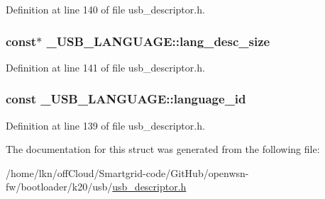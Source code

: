 Definition at line 140 of file usb\+\_\+descriptor.\+h.

\subsubsection[{\texorpdfstring{lang\+\_\+desc\+\_\+size}{lang_desc_size}}]{ const$\ast$ \+\_\+\+U\+S\+B\+\_\+\+L\+A\+N\+G\+U\+A\+G\+E\+::lang\+\_\+desc\+\_\+size}\hypertarget{struct___u_s_b___l_a_n_g_u_a_g_e_a77f740a8b24518a0a8345b3e8449a0a4}{}\label{struct___u_s_b___l_a_n_g_u_a_g_e_a77f740a8b24518a0a8345b3e8449a0a4}


Definition at line 141 of file usb\+\_\+descriptor.\+h.

\subsubsection[{\texorpdfstring{language\+\_\+id}{language_id}}]{ const \+\_\+\+U\+S\+B\+\_\+\+L\+A\+N\+G\+U\+A\+G\+E\+::language\+\_\+id}\hypertarget{struct___u_s_b___l_a_n_g_u_a_g_e_aa9c17ce22d359f944da36774d1808303}{}\label{struct___u_s_b___l_a_n_g_u_a_g_e_aa9c17ce22d359f944da36774d1808303}


Definition at line 139 of file usb\+\_\+descriptor.\+h.



The documentation for this struct was generated from the following file\+:\begin{DoxyCompactItemize}
\item 
/home/lkn/off\+Cloud/\+Smartgrid-\/code/\+Git\+Hub/openwsn-\/fw/bootloader/k20/usb/\hyperlink{usb__descriptor_8h}{usb\+\_\+descriptor.\+h}\end{DoxyCompactItemize}
